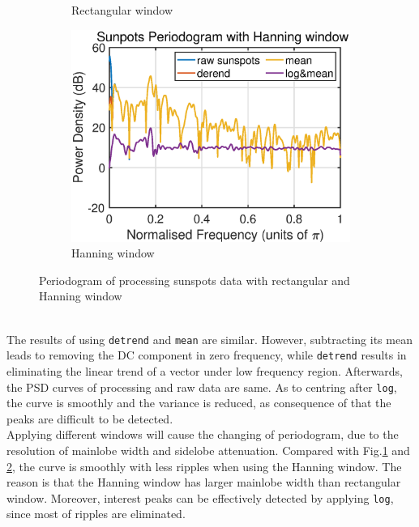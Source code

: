 \begin{figure}[htbp]
\begin{subfigure}[b]{0.33\textwidth}
         \caption{Rectangular window}
         \label{fig:rect}
     \end{subfigure}
      \hspace{-0.4cm}
     \begin{subfigure}[b]{0.33\textwidth}
         \centering
         \includegraphics[width=\textwidth]{fig/12/12a3.eps}
         \caption{Hanning window}
         \label{fig:hann}
     \end{subfigure}
        \caption{Periodogram of processing sunspots data with rectangular and Hanning window}
        \label{fig:1_2_a}
\end{figure}\\
The results of using \texttt{detrend} and \texttt{mean} are similar. However, subtracting its mean leads to removing the DC component in zero frequency, while \texttt{detrend} results in eliminating the linear trend of a vector under low frequency region. Afterwards, the PSD curves of processing and raw data are same. As to centring after \texttt{log}, the curve is smoothly and the variance is reduced, as consequence of that the peaks are difficult to be detected.\\
Applying different windows will cause the changing of periodogram, due to the resolution of mainlobe width and sidelobe attenuation. Compared with Fig.\ref{fig:rect} and \ref{fig:hann}, the curve is smoothly with less ripples when using the Hanning window. The reason is that the Hanning window has larger mainlobe width than rectangular window. Moreover, interest peaks can be effectively detected by applying \texttt{log}, since most of ripples are eliminated.
